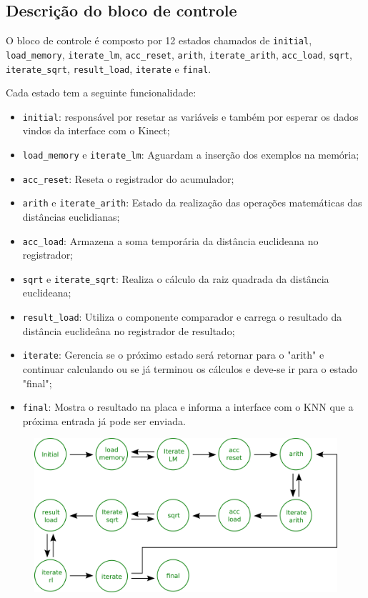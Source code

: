 \subsection{Descrição do bloco de controle}

O bloco de controle é composto por 12 estados chamados de \verb|initial|,
\verb|load_memory|, \verb|iterate_lm|, \verb|acc_reset|,
\verb|arith|, \verb|iterate_arith|, \verb|acc_load|, \verb|sqrt|,
\verb|iterate_sqrt|, \verb|result_load|, \verb|iterate| e 
\verb|final|.

Cada estado tem a seguinte funcionalidade:

\begin{itemize}
\item \verb|initial|: responsável por resetar as variáveis e também por esperar os dados vindos da interface com o Kinect;
\item \verb|load_memory| e \verb|iterate_lm|: Aguardam a inserção dos exemplos na memória;
\item \verb|acc_reset|: Reseta o registrador do acumulador;
\item \verb|arith| e \verb|iterate_arith|: Estado da realização das operações matemáticas das distâncias euclidianas;
\item \verb|acc_load|: Armazena a soma temporária da distância euclideana no registrador;
\item \verb|sqrt| e \verb|iterate_sqrt|: Realiza o cálculo da raiz quadrada da distância euclideana;
\item \verb|result_load|: Utiliza o componente comparador e carrega o resultado da distância euclideâna no registrador de resultado;
\item \verb|iterate|: Gerencia se o próximo estado será retornar para o "arith" e continuar calculando ou se já terminou os cálculos 
e deve-se ir para o estado "final";
\item \verb|final|: Mostra o resultado na placa e informa a interface com o KNN que a próxima entrada já pode ser enviada.
\end{itemize}

\begin{figure}[!ht]
\centering
\includegraphics[scale=0.2]{img/control_unit.png}
\end{figure}

